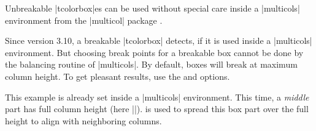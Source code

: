\begin{multicols}{2}
\begin{tcolorbox}[enhanced jigsaw,size=small,breakable,colback=yellow!10!white,
  colframe=red!50!white,break at=3cm,height fixed for=all]
Unbreakable |tcolorbox|es can be used without special care inside a
|multicols| environment from the |multicol| package \cite{mittelbach:multicol}.

Since version 3.10, a breakable |tcolorbox| detects, if it is used inside
a |multicols| environment. But choosing break points for a breakable box
cannot be done by the balancing routine of |multicols|. By default, boxes
will break at maximum column height. To get pleasant results, use the
 and  options.
\end{tcolorbox}
\end{multicols}

\enlargethispage{\baselineskip}
\begin{dispListing}
\footnotesize
\begin{multicols}{2}
  \lipsum[1]
  \begin{tcolorbox}[enhanced jigsaw,breakable,size=title,
    colback=red!5!white,colframe=red!75!black,fonttitle=\bfseries,
    title=My breakable box,pad at break=1mm, break at=-\baselineskip/0pt ]
  \lipsum[2-4]
  \end{tcolorbox}
  \lipsum[4]
\end{multicols}
\end{dispListing}
{\tcbusetemp}

\clearpage

\begin{multicols}{2}
\small
This example is already set inside a |multicols| environment.
This time, a \emph{middle} part has full column height (here |\textheight|).
 is used to spread this box part over the full
height to align with neighboring columns.
\begin{dispListing}
\lipsum[1]
\begin{tcolorbox}[enhanced jigsaw,
  breakable,
  size=title,
  colback=red!5!white,
  colframe=red!75!black,
  fonttitle=\bfseries,
  title=My breakable box,
  pad at break=2mm,
  break at=-\baselineskip/0pt,
  height fixed for=middle ]
\lipsum[2-7]
\end{tcolorbox}
\lipsum[8]
\end{dispListing}
{\tcbusetemp}
\end{multicols}


